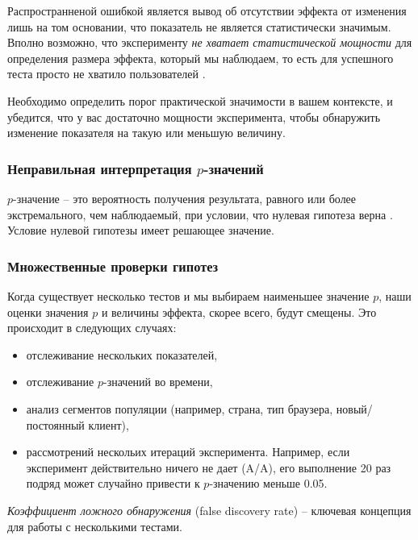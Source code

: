 \documentclass[%
	11pt,
	a4paper,
	utf8,
		]{article}
\begin{document}
Распространненой ошибкой является вывод об отсутствии эффекта от изменения лишь на том основании, что показатель не является статистически значимым. Вполно возможно, что эксперименту \emph{\color{red}не хватает статистической мощности} для определения размера эффекта, который мы наблюдаем, то есть для успешного теста просто не хватило пользователей \cite[]{kohavi:ab-tests-2021}.

Необходимо определить порог практической значимости в вашем контексте, и убедится, что у вас достаточно мощности эксперимента, чтобы обнаружить изменение показателя на такую или меньшую величину.

\subsubsection{Неправильная интерпретация $p$-значений}

$p$-значение -- это вероятность получения результата, равного или более экстремального, чем наблюдаемый, при условии, что нулевая гипотеза верна \cite[]{kohavi:ab-tests-2021}. Условие нулевой гипотезы имеет решающее значение.

\subsubsection{Множественные проверки гипотез}

Когда существует несколько тестов и мы выбираем наименьшее значение $p$, наши оценки значения $p$ и величины эффекта, скорее всего, будут смещены. Это происходит в следующих случаях:
\begin{itemize}
	\item отслеживание нескольких показателей,
	
	\item отслеживание $p$-значений во времени,
	
	\item анализ сегментов популяции (например, страна, тип браузера, новый/постоянный клиент),
	
	\item рассмотрений нескольих итераций эксперимента. Например, если эксперимент действительно ничего не дает (A/A), его выполнение 20 раз подряд может случайно привести к $p$-значению меньше 0.05.
\end{itemize}

\emph{Коэффициент ложного обнаружения} (false discovery rate) -- ключевая концепция для работы с несколькими тестами.
\end{document}
